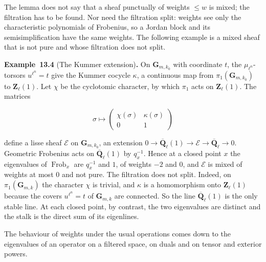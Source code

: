 \documentclass[11pt]{article}
\newenvironment{bpstatement}[2]{\par\addvspace{0.6\baselineskip}\noindent\textbf{#1}#2\textbf{.}\enspace\ignorespaces}
  {\par\addvspace{0.4\baselineskip}}
\begin{document}
\label{bp14}%
The lemma does not say that a sheaf punctually of weights \(\le w\) is mixed; the filtration has to be found. Nor need the filtration split: weights see only the characteristic polynomials of Frobenius, so a Jordan block and its semisimplification have the same weights. The following example is a mixed sheaf that is not pure and whose filtration does not split.

\label{bp15}%
\begin{bpstatement}{Example~13.4}{ (The Kummer extension)}
On \(\mathbf G_{m,k_0}\) with coordinate \(t\), the \(\mu_{\ell^n}\)-torsors \(u^{\ell^n}=t\) give the Kummer cocycle \(\kappa\), a continuous map from \(\pi_1(\mathbf G_{m,k_0})\) to \(\mathbf Z_\ell(1)\). Let \(\chi\) be the cyclotomic character, by which \(\pi_1\) acts on \(\mathbf Z_\ell(1)\). The matrices

\[
\sigma\longmapsto\begin{pmatrix}\chi(\sigma)&\kappa(\sigma)\\0&1\end{pmatrix}
\]

define a lisse sheaf \(\mathcal E\) on \(\mathbf G_{m,k_0}\), an extension \(0\to\overline{\mathbf Q}_\ell(1)\to\mathcal E\to\overline{\mathbf Q}_\ell\to0\). Geometric Frobenius acts on \(\overline{\mathbf Q}_\ell(1)\) by \(q_x^{-1}\). Hence at a closed point \(x\) the eigenvalues of \(\operatorname{Frob}_x\) are \(q_x^{-1}\) and \(1\), of weights \(-2\) and \(0\), and \(\mathcal E\) is mixed of weights at most \(0\) and not pure. The filtration does not split. Indeed, on \(\pi_1(\mathbf G_{m,k})\) the character \(\chi\) is trivial, and \(\kappa\) is a homomorphism onto \(\mathbf Z_\ell(1)\) because the covers \(u^{\ell^n}=t\) of \(\mathbf G_{m,k}\) are connected. So the line \(\overline{\mathbf Q}_\ell(1)\) is the only stable line. At each closed point, by contrast, the two eigenvalues are distinct and the stalk is the direct sum of its eigenlines.
\end{bpstatement}

\label{bp16}%
The behaviour of weights under the usual operations comes down to the eigenvalues of an operator on a filtered space, on duals and on tensor and exterior powers.
\end{document}
